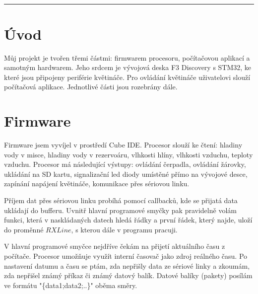 \documentclass[11pt,a4paper]{article}
\begin{document}
	\begin{center}
		\section*{}
	\end{center}
	
	\noindent
	\rule{17cm}{0.05cm}
	\section{Úvod}
	Můj projekt je tvořen třemi částmi: firmwarem procesoru, počítačovou aplikací a samotným hardwarem. Jeho srdcem je vývojová deska F3 Discovery s STM32, ke které jsou připojeny periférie květináče. Pro ovládání květináče uživatelovi slouží počítačová aplikace. Jednotlivé části jsou rozebrány dále.
	
	\section{Firmware}
	Firmware jsem vyvíjel v prostředí Cube IDE. Procesor slouží ke čtení: hladiny vody v misce, hladiny vody v rezervoáru, vlhkosti hlíny, vlhkosti vzduchu, teploty vzduchu. Procesor má následující výstupy: ovládání čerpadla, ovládání žárovky, ukládání na SD kartu, signalizační led diody umístěné přímo na vývojové desce, zapínání napájení květináče, komunikace přes sériovou linku.
	
	Příjem dat přes sériovou linku probíhá pomocí callbacků, kde se přijatá data ukládají do bufferu. Uvnitř hlavní programové smyčky pak pravidelně volám funkci, která v naskládaných datech hledá řádky a první řádek, který najde, uloží do proměnné $RXLine$, s kterou dále v programu pracuji. 
	
	V hlavní programové smyčce nejdříve čekám na přijetí aktuálního času z počítače. Procesor umožňuje využít interní časovač jako zdroj reálného času. Po nastavení datumu a času se ptám, zda nepřišly data ze sériové linky a zkoumám, zda nepřišel známý příkaz či známý datový balík. Datové balíky (pakety) posílám ve formátu "\{data1;data2;..\}" oběma směry. 
	
\end{document}
